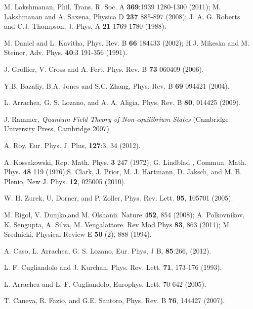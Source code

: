 \documentclass[a4paper,10pt]{report}
\begin{document}
\begin{thebibliography}{10}
M. Lakshmanan,  Phil. Trans. R. Soc. A {\bf 369}:1939 1280-1300 (2011); M. Lakshmanan and A. Saxena, Physica D {\bf 237} 885-897 (2008); J. A. G. Roberts and C.J. Thompson, J. Phys. A {\bf 21} 1769-1780 (1988).

M. Daniel and L. Kavitha, Phys. Rev. B {\bf 66} 184433 (2002); H.J. Mikeska and M. Steiner, Adv. Phys. {\bf40}:3 191-356 (1991). 

J. Grollier, V. Cross  and A. Fert, Phys. Rev. B {\bf 73} 060409 (2006).

Y.B. Bazaliy, B.A. Jones and S.C. Zhang, Phys. Rev. B {\bf 69} 094421 (2004).

L. Arrachea, G. S. Lozano, and A. A. Aligia, Phys. Rev. B {\bf 80}, 014425 (2009).

J. Rammer, \textit{Quantum Field Theory of Non-equilibrium States} (Cambridge University Press, Cambridge 2007).

A. Roy, Eur. Phys. J. {Plus}, {\bf 127}:3, 34 (2012).

A. Kossakowski, Rep. Math. Phys. {\bf 3} 247 (1972); G. Lindblad , Commun. Math. Phys. {\bf 48} 119 (1976);S. Clark, J. Prior, M. J. Hartmann, D. Jaksch, and M. B. Plenio, New J. Phys. {\bf 12}, 025005 (2010).

W. H. Zurek, U. Dorner, and P. Zoller, Phys. Rev. Lett. {\bf 95}, 105701 (2005).

\newblock M. Rigol, V. Dunjko,and M. Olshanii.
\newblock Nature {\bf 452}, 854 (2008);
\newblock A. Polkovnikov, K. Sengupta, A. Silva, M. Vengalattore.
\newblock Rev Mod Phys {\bf 83}, 863 (2011);
\newblock M. Srednicki, 
\newblock Physical Review E \textbf{50} (2), 888 (1994).

A. Caso, L. Arrachea, G. S. Lozano, Eur. Phys, J B, {\bf 85}:266, (2012).

L. F. Cugliandolo and J. Kurchan, Phys. Rev. Lett. {\bf 71}, 173-176 (1993).

L. Arrachea and L. F. Cugliandolo, Europhys. Lett. 70 642 (2005).

T. Caneva, R. Fazio, and G.E. Santoro, Phys. Rev. B {\bf 76}, 144427 (2007).

\end{thebibliography}
\end{document}
